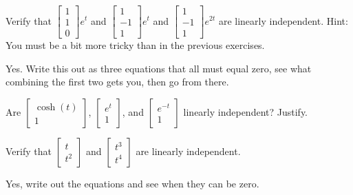 \begin{exercise}
Verify that
$\left[ \begin{smallmatrix}
1 \\ 1 \\ 0
\end{smallmatrix} \right] e^{t}$ and
$\left[ \begin{smallmatrix}
1 \\ -1 \\ 1
\end{smallmatrix} \right] e^{t}$ 
and
$\left[ \begin{smallmatrix}
1 \\ -1 \\ 1
\end{smallmatrix} \right] e^{2t}$ 
are linearly independent.  Hint: You must be a bit more tricky than in the
previous exercises.
\end{exercise}
\comboSol{%
}
{%
Yes. Write this out as three equations that all must equal zero, see what combining the first two gets you, then go from there.
}

\begin{exercise}\ansMark%
Are
$\left[ \begin{smallmatrix}
\cosh(t) \\ 1
\end{smallmatrix}\right]$,
$\left[ \begin{smallmatrix}
e^{t} \\ 1
\end{smallmatrix}\right]$,
and
$\left[ \begin{smallmatrix}
e^{-t} \\ 1
\end{smallmatrix}\right]$
linearly independent?  Justify.
\end{exercise}

\begin{exercise}
Verify that
$\left[ \begin{smallmatrix}
t \\ t^2
\end{smallmatrix} \right]$ and
$\left[ \begin{smallmatrix}
t^3 \\ t^4
\end{smallmatrix} \right]$ 
are linearly independent.
\end{exercise}
\comboSol{%
}
{%
Yes, write out the equations and see when they can be zero.
}


